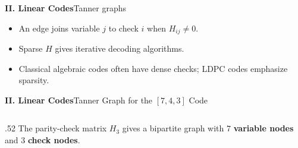 \begin{frame}{\textbf{II. Linear Codes}}{Tanner graphs}
\small
{}
\begin{itemize}
  \item An edge joins variable $j$ to check $i$ when $H_{ij}\ne0$.
  \item Sparse $H$ gives iterative decoding algorithms.
  \item Classical algebraic codes often have dense checks; LDPC codes emphasize sparsity.
\end{itemize}
\end{frame}

\begin{frame}{\textbf{II. Linear Codes}}{Tanner Graph for the $[7,4,3]$ Code}
\small
\begin{columns}[T,onlytextwidth]
  \begin{column}{.52\textwidth}
    The parity-check matrix $H_3$ gives a bipartite graph with $7$ \textcolor{TealDarkCyan}{\textbf{variable nodes}} and $3$ \textcolor{AccentCyan}{\textbf{check nodes}}.


\end{column}
\end{columns}
\end{frame}
